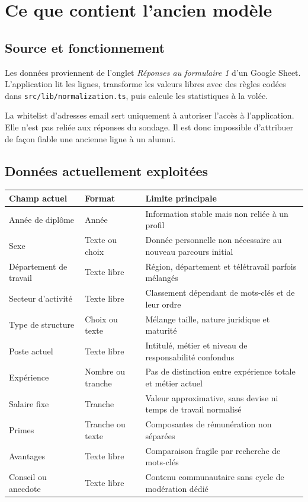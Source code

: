 \documentclass[11pt,a4paper]{article}
\begin{document}
\section{Ce que contient l'ancien modèle}

\subsection{Source et fonctionnement}

Les données proviennent de l'onglet \textit{Réponses au formulaire 1} d'un
Google Sheet. L'application lit les lignes, transforme les valeurs libres avec
des règles codées dans \texttt{src/lib/normalization.ts}, puis calcule les
statistiques à la volée.

La whitelist d'adresses email sert uniquement à autoriser l'accès à
l'application. Elle n'est pas reliée aux réponses du sondage. Il est donc
impossible d'attribuer de façon fiable une ancienne ligne à un alumni.

\subsection{Données actuellement exploitées}

\begin{longtable}{@{}L{43mm}L{47mm}L{77mm}@{}}
  \toprule
  \textbf{Champ actuel} & \textbf{Format} & \textbf{Limite principale} \\
  \midrule
  \endhead
  Année de diplôme & Année & Information stable mais non reliée à un profil \\
  Sexe & Texte ou choix & Donnée personnelle non nécessaire au nouveau parcours initial \\
  Département de travail & Texte libre & Région, département et télétravail parfois mélangés \\
  Secteur d'activité & Texte libre & Classement dépendant de mots-clés et de leur ordre \\
  Type de structure & Choix ou texte & Mélange taille, nature juridique et maturité \\
  Poste actuel & Texte libre & Intitulé, métier et niveau de responsabilité confondus \\
  Expérience & Nombre ou tranche & Pas de distinction entre expérience totale et métier actuel \\
  Salaire fixe & Tranche & Valeur approximative, sans devise ni temps de travail normalisé \\
  Primes & Tranche ou texte & Composantes de rémunération non séparées \\
  Avantages & Texte libre & Comparaison fragile par recherche de mots-clés \\
  Conseil ou anecdote & Texte libre & Contenu communautaire sans cycle de modération dédié \\
  \bottomrule
\end{longtable}
\end{document}

